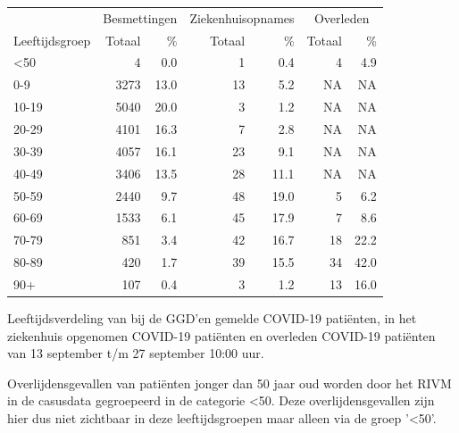 \documentclass[
  english,
  man,floatsintext]{apa6}
\begin{document}
\begin{table}
\centering\begingroup\fontsize{11}{13}\selectfont

\begin{threeparttable}
\begin{tabular}{lrrrrrr}
\toprule
\multicolumn{1}{c}{ } & \multicolumn{2}{c}{Besmettingen} & \multicolumn{2}{c}{Ziekenhuisopnames} & \multicolumn{2}{c}{Overleden} \\
\cmidrule(l{3pt}r{3pt}){2-3} \cmidrule(l{3pt}r{3pt}){4-5} \cmidrule(l{3pt}r{3pt}){6-7}
Leeftijdsgroep & Totaal & \% & Totaal & \% & Totaal & \%\\
\midrule
<50 & 4 & 0.0 & 1 & 0.4 & 4 & 4.9\\
0-9 & 3273 & 13.0 & 13 & 5.2 & NA & NA\\
10-19 & 5040 & 20.0 & 3 & 1.2 & NA & NA\\
20-29 & 4101 & 16.3 & 7 & 2.8 & NA & NA\\
30-39 & 4057 & 16.1 & 23 & 9.1 & NA & NA\\
40-49 & 3406 & 13.5 & 28 & 11.1 & NA & NA\\
50-59 & 2440 & 9.7 & 48 & 19.0 & 5 & 6.2\\
60-69 & 1533 & 6.1 & 45 & 17.9 & 7 & 8.6\\
70-79 & 851 & 3.4 & 42 & 16.7 & 18 & 22.2\\
80-89 & 420 & 1.7 & 39 & 15.5 & 34 & 42.0\\
90+ & 107 & 0.4 & 3 & 1.2 & 13 & 16.0\\
\bottomrule
\end{tabular}
\begin{tablenotes}
\item[1] Leeftijdsverdeling van bij de GGD’en gemelde COVID-19 patiënten, in het ziekenhuis opgenomen COVID-19 patiënten en overleden COVID-19 patiënten van 13 september t/m 27 september 10:00 uur.
\item[2] Overlijdensgevallen van patiënten jonger dan 50 jaar oud worden door het RIVM in de casusdata gegroepeerd in de categorie <50. Deze overlijdensgevallen zijn hier dus niet zichtbaar in deze leeftijdsgroepen maar alleen via de groep '<50'.
\end{tablenotes}
\end{threeparttable}
\endgroup{}
\end{table}

\newpage
\end{document}
